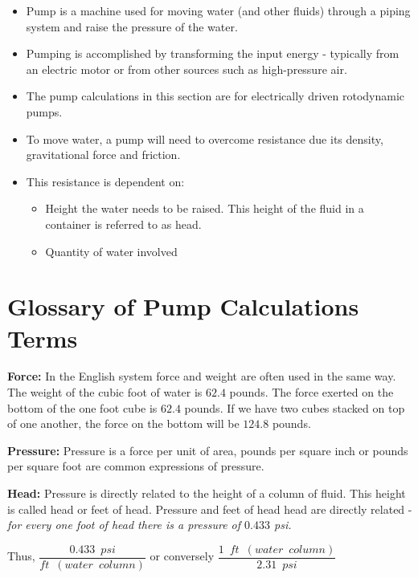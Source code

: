 \begin{itemize}
\item Pump is a machine used for moving water (and other fluids) through a piping system and raise the pressure of the water.
\item Pumping is accomplished by transforming the input energy - typically from an electric motor or from other sources such as high-pressure air.
\item The pump calculations in this section are for electrically driven rotodynamic pumps.
\item To move water, a pump will need to overcome resistance due its density, gravitational force and friction.
\item This resistance is dependent on:
\begin{itemize}
\item Height the water needs to be raised.  This height of the fluid in a container is referred to as head. 
\item Quantity of water involved
\end{itemize}
\end{itemize}

\section{Glossary of Pump Calculations Terms}

\textbf{Force:}  In the English system force and weight are often used in the same way. The weight of the cubic foot of water is $62.4$ pounds. The force exerted on the bottom of the one foot cube is $62.4$ pounds. If we have two cubes stacked on top of one another, the force on the bottom will be $124.8$ pounds.

\textbf{Pressure:} Pressure is a force per unit of area, pounds per square inch or pounds per square foot are common expressions of pressure. 

\textbf{Head:}  Pressure is directly related to the height of a column of fluid. This height is called head or feet of head. Pressure and feet of head head are directly related - \emph{for every one foot of head there is a pressure of $0.433$ psi.}

\vspace{0.2cm}
Thus, $\dfrac{0.433 \enspace psi}{ft \enspace (water \enspace column)}$ or conversely $\dfrac{1 \enspace ft \enspace (water \enspace column)}{2.31 \enspace psi}$\\
\\

